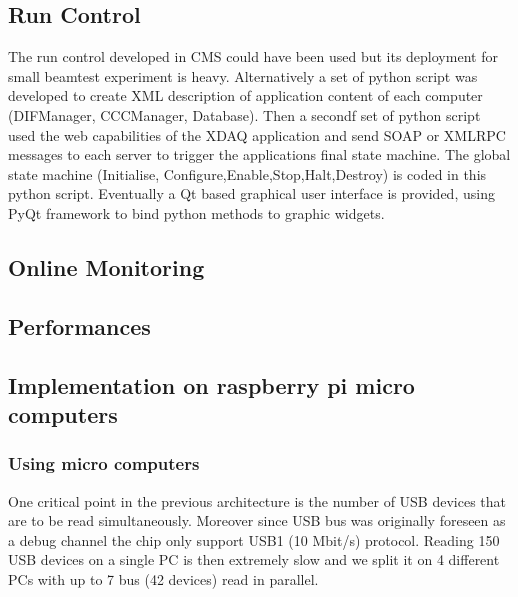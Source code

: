 \documentclass[english]{article}
\begin{document}
\subsection{Run Control}
The run control developed in CMS could have been used but its deployment for small beamtest experiment is heavy. Alternatively a set of python script was developed to create XML description of application content of each computer (DIFManager, CCCManager, Database). Then a secondf set of python script used the web capabilities of the XDAQ application and send SOAP or XMLRPC messages to each server to trigger the applications final state machine. 
The global state machine (Initialise, Configure,Enable,Stop,Halt,Destroy) is coded in this python script. Eventually a Qt based graphical user interface is provided, using PyQt \cite{PyQt} framework to bind python methods to graphic widgets. 
\subsection{Online Monitoring}
\subsection{Performances}
\subsection{Implementation on raspberry pi micro computers}
\subsubsection{Using micro computers}
One critical point in the previous architecture is the number of USB devices that are to be read simultaneously. Moreover since USB bus was originally foreseen as a debug channel the chip only support USB1 (10 Mbit/s) protocol. Reading  150 USB devices on a single PC is then extremely slow and we split it on 4 different PCs with up to 7 bus (42 devices) read in parallel.    
\end{document}
